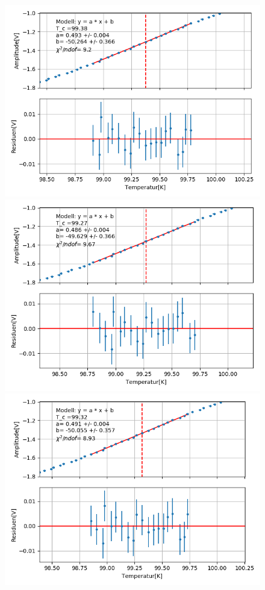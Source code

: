 \documentclass[12pt,a4paper]{article}
\begin{document}
\begin{figure}
\centering
\includegraphics[scale=0.8]{Bilder/Haupt_Supra/X1_Steigung.png}
\includegraphics[scale=0.5]{Bilder/Haupt_Supra/X1_Steigung2.png}
\includegraphics[scale=0.5]{Bilder/Haupt_Supra/X1_Steigung3.png}

\end{figure}
\end{document}
